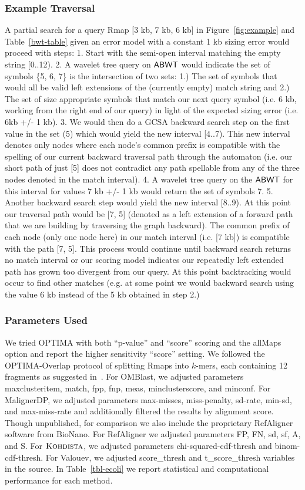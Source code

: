 \subsubsection{Example Traversal}
A partial search for a query Rmap [3 kb, 7 kb, 6 kb] in Figure~\ref{fig:example} and Table~\ref{bwt-table} given an error model with a constant 1 kb sizing error would proceed with steps: 1. Start with the semi-open interval matching the empty string [0..12).  2. A wavelet tree query on $\mbox{\rm {\sf ABWT}}$ would indicate the set of symbols \{5, 6, 7\} is the intersection of two sets: 1.) The set of symbols that would all be valid left extensions of the (currently empty) match string and 2.)  The set of size appropriate symbols that match our next query symbol (i.e. 6 kb, working from the right end of our query) in light of the expected sizing error (i.e. 6kb +/- 1 kb). 3. We would then do a GCSA backward search step on the first value in the set (5) which would yield the new interval [4..7).  This new interval denotes only nodes where each node's common prefix is compatible with the spelling of our current backward traversal path through the automaton (i.e. our short path of just [5] does not contradict any path spellable from any of the three nodes denoted in the match interval).  4. A wavelet tree query on the $\mbox{\rm {\sf ABWT}}$ for this interval for values 7 kb +/- 1 kb would return the set of symbols {7}. 5. Another backward search step would yield the new interval [8..9). At this point our traversal path would be [7, 5] (denoted as a left extension of a forward path that we are building by traversing the graph backward).  The common prefix of each node (only one node here) in our match interval (i.e. [7 kb]) is compatible with the path [7, 5]. This process would continue until backward search returns no match interval or our scoring model indicates our repeatedly left extended path has grown too divergent from our query. At this point backtracking would occur to find other matches (e.g. at some point we would backward search using the value 6 kb instead of the 5 kb obtained in step 2.)

\subsubsection{Parameters Used}
We tried OPTIMA with both ``p-value'' and ``score'' scoring and the allMaps option and report the higher sensitivity ``score'' setting.  We followed the OPTIMA-Overlap protocol of splitting Rmaps into $k$-mers, each containing 12 fragments as suggested in~\cite{optima}.
For OMBlast, we adjusted parameters maxclusteritem, match, fpp, fnp, meas, minclusterscore, and minconf.  For MalignerDP, we adjusted parameters max-misses, miss-penalty, sd-rate, min-sd, and max-miss-rate and additionally filtered the results by alignment score. Though unpublished, for comparison we also include the proprietary RefAligner software from BioNano. For RefAligner we adjusted parameters FP, FN, sd, sf, A, and S. For $\mbox{\rm \textsc{Kohdista}}$, we adjusted parameters chi-squared-cdf-thresh and binom-cdf-thresh.  For Valouev, we adjusted score\_thresh and t\_score\_thresh variables in the source.  In Table~\ref{tbl-ecoli} we report statistical and computational performance for each method.


